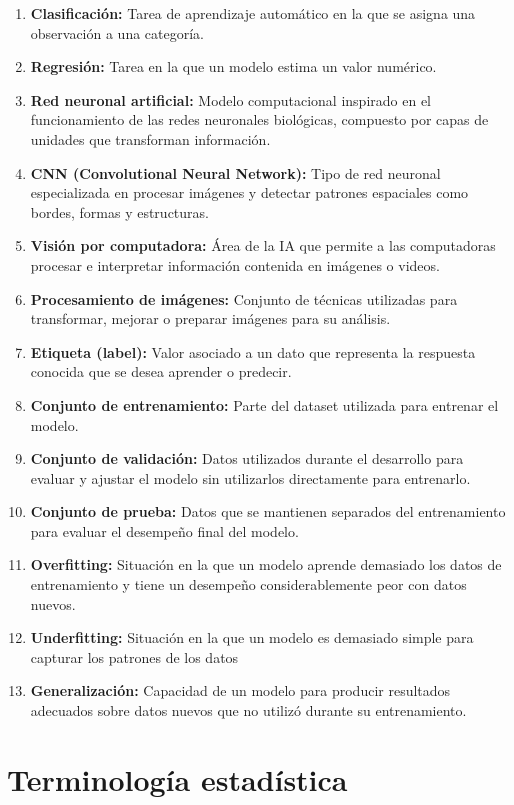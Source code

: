 \documentclass[11pt,letterpaper,DIV=12]{scrartcl}
\begin{document}
\begin{enumerate}
  \item \textbf{Clasificación:} Tarea de aprendizaje automático en la que se asigna una observación a una categoría.
  \item \textbf{Regresión:} Tarea en la que un modelo estima un valor numérico.
  \item \textbf{Red neuronal artificial:} Modelo computacional inspirado en el funcionamiento de las redes neuronales biológicas, compuesto por capas de unidades que transforman información.
  \item \textbf{CNN (Convolutional Neural Network):} Tipo de red neuronal especializada en procesar imágenes y detectar patrones espaciales como bordes, formas y estructuras.
  \item \textbf{Visión por computadora:} Área de la IA que permite a las computadoras procesar e interpretar información contenida en imágenes o videos.
  \item \textbf{Procesamiento de imágenes:} Conjunto de técnicas utilizadas para transformar, mejorar o preparar imágenes para su análisis.
  \item \textbf{Etiqueta (label):} Valor asociado a un dato que representa la respuesta conocida que se desea aprender o predecir.
  \item \textbf{Conjunto de entrenamiento:} Parte del dataset utilizada para entrenar el modelo.
  \item \textbf{Conjunto de validación:} Datos utilizados durante el desarrollo para evaluar y ajustar el modelo sin utilizarlos directamente para entrenarlo.
  \item \textbf{Conjunto de prueba:} Datos que se mantienen separados del entrenamiento para evaluar el desempeño final del modelo.
  \item \textbf{Overfitting:} Situación en la que un modelo aprende demasiado los datos de entrenamiento y tiene un desempeño considerablemente peor con datos nuevos.
  \item \textbf{Underfitting:} Situación en la que un modelo es demasiado simple para capturar los patrones de los datos
  \item \textbf{Generalización:} Capacidad de un modelo para producir resultados adecuados sobre datos nuevos que no utilizó durante su entrenamiento.
\end{enumerate}

\section{Terminología estadística}
\end{document}
